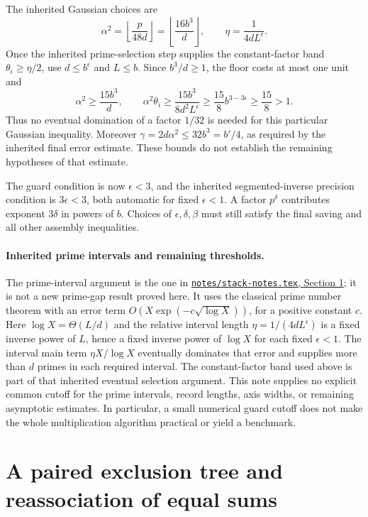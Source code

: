 \documentclass[11pt]{article}
\begin{document}
The inherited Gaussian choices are
\[
 \alpha^2=\left\lfloor\frac{p}{48d}\right\rfloor
          =\left\lfloor\frac{16b^3}{d}\right\rfloor,
 \qquad \eta=\frac1{4dL^\epsilon}.
\]
Once the inherited prime-selection step supplies the constant-factor band
$\theta_i\ge\eta/2$, use $d\le b^\epsilon$ and $L\le b$.
Since $b^3/d\ge1$, the floor costs at most one unit and
\[
 \alpha^2\ge\frac{15b^3}{d},\qquad
 \alpha^2\theta_i\ge
 \frac{15b^3}{8d^2L^\epsilon}
 \ge\frac{15}{8}b^{3-3\epsilon}\ge\frac{15}{8}>1.
\]
Thus no eventual domination of a factor $1/32$ is needed for this particular
Gaussian inequality. Moreover
$\gamma=2d\alpha^2\le32b^3=b'/4$, as required by the inherited final
error estimate. These bounds do not establish the remaining hypotheses of
that estimate.

The guard condition is now $\epsilon<3$, and the inherited segmented-inverse
precision condition is $3\epsilon<3$, both automatic for fixed
$\epsilon<1$. A factor $p^\delta$ contributes exponent $3\delta$ in powers
of $b$. Choices of $\epsilon,\delta,\beta$ must still satisfy the final
saving and all other assembly inequalities.

\paragraph{Inherited prime intervals and remaining thresholds.}
The prime-interval argument is the one in
\href{https://github.com/Swapnil-jain/integer-mult-kappa/blob/f2176bc/notes/stack-notes.tex}
{\texttt{notes/stack-notes.tex}, Section 1}; it is not a new prime-gap result
proved here. It uses the classical prime number theorem with an error term
$O(X\exp(-c\sqrt{\log X}))$, for a positive constant $c$.
Here $\log X=\Theta(L/d)$ and the relative interval length
$\eta=1/(4dL^\epsilon)$ is a fixed inverse power of $L$, hence a fixed
inverse power of $\log X$ for each fixed $\epsilon<1$.
The interval main term $\eta X/\log X$ eventually dominates that error
and supplies more than $d$ primes in each required interval. The constant-factor band
used above is part of that inherited eventual selection argument.
This note supplies no explicit common cutoff for the prime intervals,
record lengths, axis widths, or remaining asymptotic estimates. In
particular, a small numerical guard cutoff does not make the whole
multiplication algorithm practical or yield a benchmark.


\section{A paired exclusion tree and reassociation of equal sums}
\end{document}
